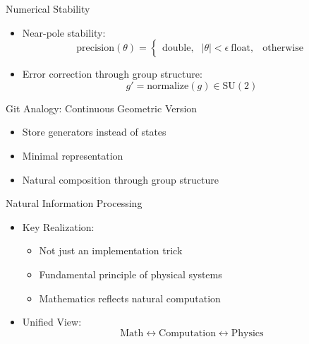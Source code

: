 \documentclass{beamer}
\begin{document}
\begin{frame}{Numerical Stability}
\begin{itemize}
\item Near-pole stability:
\begin{equation*}
\text{precision}(\theta) = \begin{cases}
\text{double}, & |\theta| < \epsilon \
\text{float}, & \text{otherwise}
\end{cases}
\end{equation*}
\item Error correction through group structure:
\begin{equation*}
g' = \text{normalize}(g) \in \text{SU}(2)
\end{equation*}
\end{itemize}
\end{frame}
\begin{frame}{Git Analogy: Continuous Geometric Version}
\begin{center}
\end{center}
\begin{itemize}
\item Store generators instead of states
\item Minimal representation
\item Natural composition through group structure
\end{itemize}
\end{frame}
\begin{frame}{Natural Information Processing}
\begin{itemize}
\item Key Realization:
\begin{itemize}
\item Not just an implementation trick
\item Fundamental principle of physical systems
\item Mathematics reflects natural computation
\end{itemize}
\pause
\item Unified View:
\begin{equation*}
\text{Math} \leftrightarrow \text{Computation} \leftrightarrow \text{Physics}
\end{equation*}
\end{itemize}
\end{frame}
\end{document}
